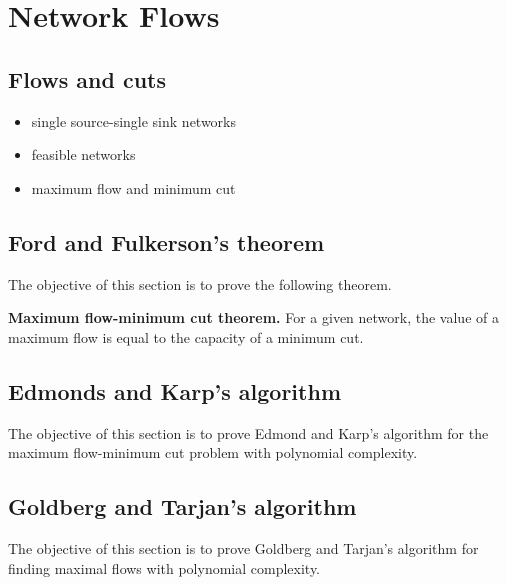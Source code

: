 
\chapter{Network Flows}
\label{chap:network_flows}



\section{Flows and cuts}

\begin{itemize}
\item single source-single sink networks

\item feasible networks

\item maximum flow and minimum cut
\end{itemize}



\section{Ford and Fulkerson's theorem}

The objective of this section is to prove the following theorem.

\begin{theorem}
\textbf{Maximum flow-minimum cut theorem.}
For a given network, the value of a maximum flow is equal to the
capacity of a minimum cut.
\end{theorem}



\section{Edmonds and Karp's algorithm}

The objective of this section is to prove Edmond and Karp's algorithm
for the maximum flow-minimum cut problem with polynomial
complexity.



\section{Goldberg and Tarjan's algorithm}

The objective of this section is to prove Goldberg and Tarjan's
algorithm for finding maximal flows with polynomial complexity.

